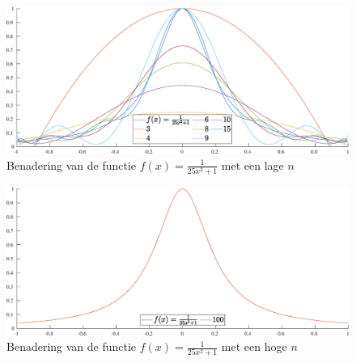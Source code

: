 \documentclass[a4paper, 12pt, titlepage, fleqn]{article}
\begin{document}
\begin{figure}
\centering
\includegraphics[scale=0.4]{../Afbeeldingen/runge_nul_laag.eps}
\caption{Benadering van de functie $f(x) = \frac{1}{25x^2+1}$ met een lage $n$}
\label{fig:lageNRungeNul}
\end{figure}

\begin{figure}
\centering
\includegraphics[scale=0.4]{../Afbeeldingen/runge_nul_hoog.eps}
\caption{Benadering van de functie $f(x) = \frac{1}{25x^2+1}$ met een hoge $n$}
\label{fig:hogeNRungeNul}
\end{figure}
\end{document}
